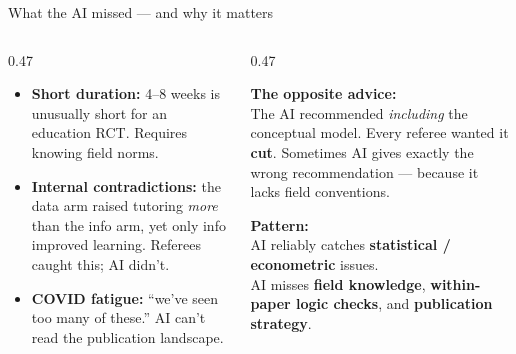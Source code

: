 \documentclass[aspectratio=169, 10pt]{beamer}
\begin{document}
\begin{frame}{What the AI missed --- and why it matters}
\begin{columns}[T]
\begin{column}{0.47\textwidth}
\begin{tcolorbox}[coralbox, title={\faTimes\quad The Misses}, top=4pt, bottom=4pt]
\small
\begin{itemize}\setlength{\itemsep}{4pt}
  \item \textbf{Short duration:} 4--8 weeks is unusually short for an education RCT. Requires knowing field norms.
  \item \textbf{Internal contradictions:} the data arm raised tutoring \textit{more} than the info arm, yet only info improved learning. Referees caught this; AI didn't.
  \item \textbf{COVID fatigue:} ``we've seen too many of these.'' AI can't read the publication landscape.
\end{itemize}
\end{tcolorbox}
\end{column}
\begin{column}{0.47\textwidth}
\begin{tcolorbox}[quotebox]
\small
\textbf{The opposite advice:}\\[3pt]
The AI recommended \textit{including} the conceptual model. Every referee wanted it \textbf{cut}.
\vskip4pt
Sometimes AI gives exactly the wrong recommendation --- because it lacks field conventions.
\end{tcolorbox}
\vskip4pt
\begin{tcolorbox}[accentbox]
\small
\textbf{Pattern:}\\[2pt]
AI reliably catches \textbf{statistical / econometric} issues.\\[2pt]
AI misses \textbf{field knowledge}, \textbf{within-paper logic checks}, and \textbf{publication strategy}.
\end{tcolorbox}
\end{column}
\end{columns}
\end{frame}
\end{document}
